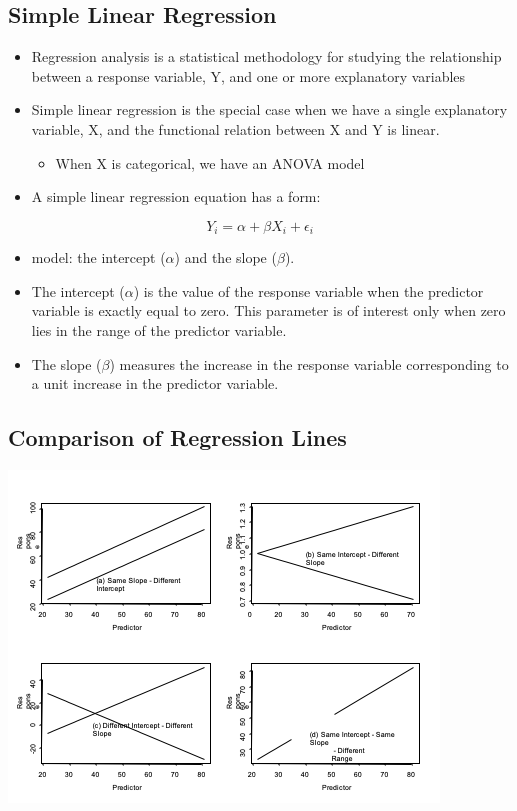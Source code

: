 \documentclass[
]{book}
\providecommand{\tightlist}{%
  \setlength{\itemsep}{0pt}\setlength{\parskip}{0pt}}
\begin{document}
\hypertarget{simple-linear-regression}{%
\subsection{Simple Linear Regression}\label{simple-linear-regression}}

\begin{itemize}
\tightlist
\item
  Regression analysis is a statistical methodology for studying the relationship between a response variable, Y, and one or more explanatory variables
\item
  Simple linear regression is the special case when we have a single explanatory variable, X, and the functional relation between X and Y is linear.

  \begin{itemize}
  \tightlist
  \item
    When X is categorical, we have an ANOVA model
  \end{itemize}
\item
  A simple linear regression equation has a form:
\end{itemize}

\[Y_i=\alpha+\beta X_i+\epsilon_i\]

\begin{itemize}
\tightlist
\item
  model: the intercept (\(\alpha\)) and the slope (\(\beta\)).
\item
  The intercept (\(\alpha\)) is the value of the response variable when the predictor variable is exactly equal to zero. This parameter is of interest only when zero lies in the range of the predictor variable.
\item
  The slope (\(\beta\)) measures the increase in the response variable corresponding to a unit increase in the predictor variable.
\end{itemize}

\hypertarget{comparison-of-regression-lines}{%
\subsection{Comparison of Regression Lines}\label{comparison-of-regression-lines}}

\includegraphics[width=0.7\linewidth]{./12_19}
\end{document}
